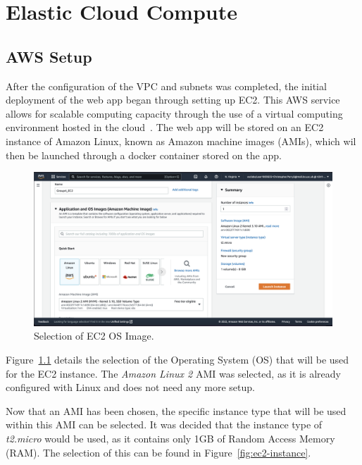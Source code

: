 \chapter{Elastic Cloud Compute}\label{ch:ec2}

\section{AWS Setup}\label{sec:aws-setup}

After the configuration of the VPC and subnets was completed, the initial deployment of the web app began through
setting up EC2.
This AWS service allows for scalable computing capacity through the use of a virtual computing environment hosted in the
cloud~\parencite{aws2022ec2}.
The web app will be stored on an EC2 instance of Amazon Linux, known as Amazon machine images (AMIs), which wil then be
launched through a docker container stored on the app.

\begin{figure}[!htbp]
    \centering
    \includegraphics[scale=0.3]{resources/ec2/create-instance-application-and-os-images}
    \caption{Selection of EC2 OS Image.}
    \label{fig:ec2-os}
\end{figure}

Figure~\ref{fig:ec2-os} details the selection of the Operating System (OS) that will be used for the EC2 instance.
The \textit{Amazon Linux 2} AMI was selected, as it is already configured with Linux and does not need any more setup.

\clearpage

Now that an AMI has been chosen, the specific instance type that will be used within this AMI can be selected.
It was decided that the instance type of \textit{t2.micro} would be used, as it contains only 1GB of Random Access
Memory (RAM).
The selection of this can be found in Figure~\ref{fig:ec2-instance}.

